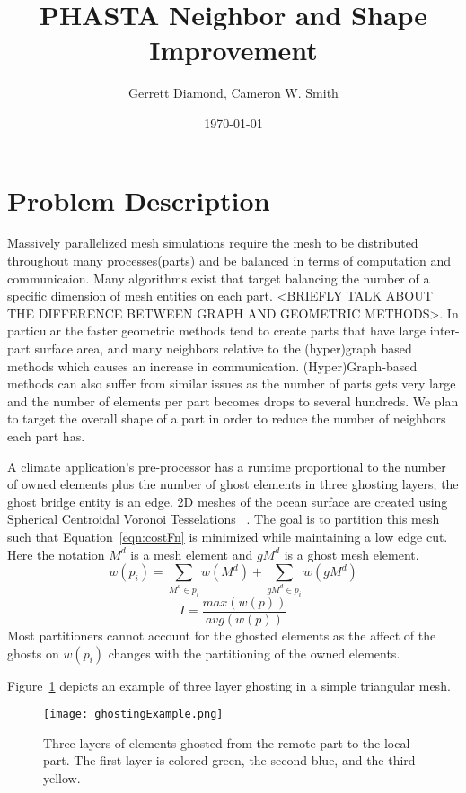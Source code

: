 \documentclass[a4paper]{article}
\title{PHASTA Neighbor and Shape Improvement}
\author{Gerrett Diamond, Cameron W. Smith}
\date{\today}
\begin{document}
\maketitle

\section{Problem Description}

Massively parallelized mesh simulations require the mesh to be distributed throughout many processes(parts) and be balanced in terms of computation and communicaion. Many algorithms exist that target balancing the number of a specific dimension of mesh entities on each part. <BRIEFLY TALK ABOUT THE DIFFERENCE BETWEEN GRAPH AND GEOMETRIC METHODS>.  In particular the faster geometric methods tend to create parts that have large inter-part surface area, and many neighbors relative to the (hyper)graph based methods which causes an increase in communication. (Hyper)Graph-based methods can also suffer from similar issues as the number of parts gets very large and the number of elements per part becomes drops to several hundreds.  We plan to target the overall shape of a part in order to reduce the number of neighbors each part has. 
 
A climate application's pre-processor has a runtime proportional to the number of owned elements plus the number of ghost elements in three ghosting layers; the ghost bridge entity is an edge.  2D meshes of the ocean surface are created using Spherical Centroidal Voronoi Tesselations ~\cite{JuRingler2011,ringler2008}.  The goal is to partition this mesh such that Equation~\ref{eqn:costFn} is minimized while maintaining a low edge cut.  Here the notation $M^d$ is a mesh element and $gM^d$ is a ghost mesh element.
\begin{equation}
\label{eqn:weightVoroni}
w(p_i) = \sum_{M^d \in p_i}w(M^d) + \sum_{gM^d \in p_i}w(gM^d)
\end{equation}
\begin{equation}
\label{eqn:costFn}
I = \frac{max(w(p))}{avg(w(p))}
\end{equation}
Most partitioners cannot account for the ghosted elements as the affect of the ghosts on $w(p_i)$ changes with the partitioning of the owned elements.  

Figure~\ref{fig:ghostEx} depicts an example of three layer ghosting in a simple triangular mesh.

\begin{figure} 
\centering
\texttt{[image: ghostingExample.png]}
\caption{\label{fig:ghostEx} Three layers of elements ghosted from the remote part to the local part.  The first layer is colored green, the second blue, and the third yellow.}
\end{figure}
\end{document}
